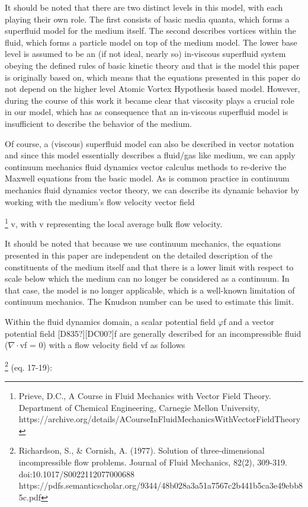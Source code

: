 \documentclass[twoside,final]{article}
\begin{document}
{It should be noted that there are two distinct levels in this model, with each
playing their own role. The first consists of basic media quanta, which forms a
superfluid model for the medium itself. The second describes vortices within the
fluid, which forms a particle model on top of the medium model. The lower base
level is assumed to be an (if not ideal, nearly so) in-viscous superfluid system
obeying the defined rules of basic kinetic theory and that is the model this
paper is originally based on, which means that the equations presented in this
paper do not depend on the higher level Atomic Vortex Hypothesis based model.
However, during the course of this work it became clear that viscosity plays a
crucial role in our model, which has as consequence that an in-viscous
superfluid model is insufficient to describe the behavior of the medium.

Of course, a (viscous) superfluid model can also be described in vector notation
and since this model essentially describes a fluid/gas like medium, we can apply
continuum mechanics fluid dynamics vector calculus methods to re-derive the
Maxwell equations from the basic model. As is common practice in continuum
mechanics fluid dynamics vector theory, we can describe its dynamic behavior by
working with the medium's flow velocity vector field

\footnote{ Prieve, D.C., A
Course in Fluid Mechanics with Vector Field Theory. Department of Chemical
Engineering, Carnegie Mellon University,
https://archive.org/details/ACourseInFluidMechanicsWithVectorFieldTheory\par }
v, with v representing the local average bulk flow velocity. 

It should be noted that because we use continuum mechanics, the equations
presented in this paper are independent on the detailed description of the
constituents of the medium itself and that there is a lower limit with respect
to scale below which the medium can no longer be considered as a continuum. In
that case, the model is no longer applicable, which is a well-known limitation
of continuum mechanics. The Knudson number can be used to estimate this limit. 

Within the fluid dynamics domain, a scalar potential field $\varphi $f and a
vector potential field [D835?][DC00?]f are generally described for an
incompressible fluid (${\nabla}{\cdot}$vf = 0) with a flow velocity field vf as
follows

\footnote{ Richardson, S., \& Cornish, A. (1977). Solution of three-dimensional
incompressible flow problems. Journal of Fluid Mechanics, 82(2), 309-319.
doi:10.1017/S0022112077000688
https://pdfs.semanticscholar.org/9344/48b028a3a51a7567c2b441b5ca3e49ebb85c.pdf
\par } (eq. 17-19):

}
\end{document}
